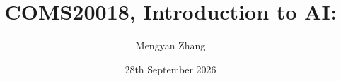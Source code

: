 \usepackage{amsmath, amssymb, graphicx}
\usepackage[]{algorithm2e}
\usepackage{pdfpages}
\usepackage{bm}
\usepackage{relsize}
\usepackage[british]{babel}
\usepackage{tikz,tikzsymbols}
\usepackage{hyperref}
\usepackage{cancel}
\usepackage{caption,subcaption}
\usepackage{adjustbox}
\usepackage{overpic}
\usepackage[UKenglish]{isodate}

\usetikzlibrary{arrows,decorations.markings,positioning}

\newcommand{\bs}{\boldsymbol}


\hypersetup{colorlinks,linkcolor=,urlcolor=blue}
\newenvironment{titledslide}[1]{\begin{frame}\frametitle{#1}}{\end{frame}}



\author{Mengyan Zhang}

\title{COMS20018, Introduction to AI:\\ \vspace{5pt} \lecttitle}

\date{28th September 2026}

